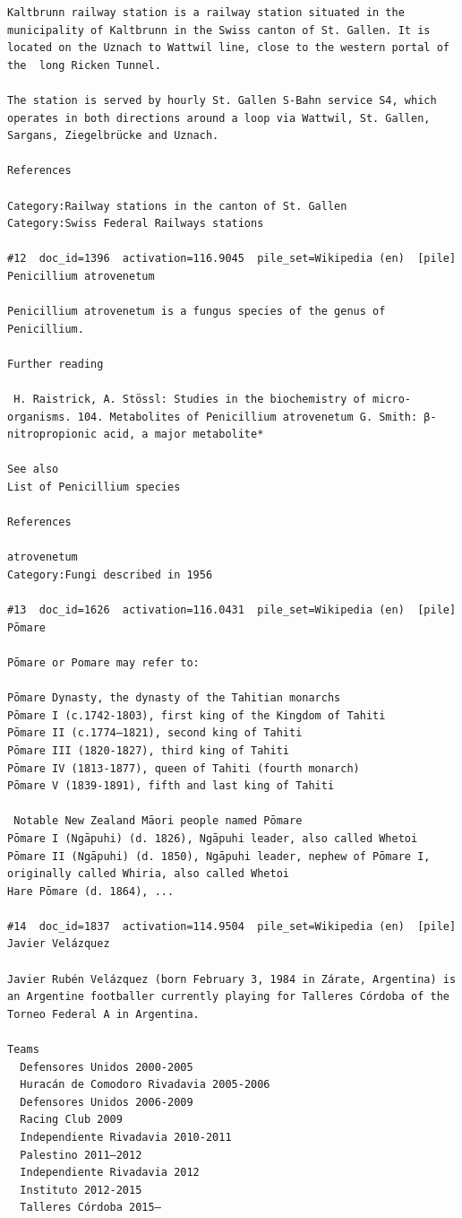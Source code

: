 \begin{verbatim}
Kaltbrunn railway station is a railway station situated in the municipality of Kaltbrunn in the Swiss canton of St. Gallen. It is located on the Uznach to Wattwil line, close to the western portal of the  long Ricken Tunnel.

The station is served by hourly St. Gallen S-Bahn service S4, which operates in both directions around a loop via Wattwil, St. Gallen, Sargans, Ziegelbrücke and Uznach.

References 

Category:Railway stations in the canton of St. Gallen
Category:Swiss Federal Railways stations

#12  doc_id=1396  activation=116.9045  pile_set=Wikipedia (en)  [pile]
Penicillium atrovenetum

Penicillium atrovenetum is a fungus species of the genus of Penicillium.

Further reading

 H. Raistrick, A. Stössl: Studies in the biochemistry of micro-organisms. 104. Metabolites of Penicillium atrovenetum G. Smith: β-nitropropionic acid, a major metabolite*

See also
List of Penicillium species

References

atrovenetum
Category:Fungi described in 1956

#13  doc_id=1626  activation=116.0431  pile_set=Wikipedia (en)  [pile]
Pōmare

Pōmare or Pomare may refer to:

Pōmare Dynasty, the dynasty of the Tahitian monarchs
Pōmare I (c.1742-1803), first king of the Kingdom of Tahiti
Pōmare II (c.1774–1821), second king of Tahiti
Pōmare III (1820-1827), third king of Tahiti
Pōmare IV (1813-1877), queen of Tahiti (fourth monarch)
Pōmare V (1839-1891), fifth and last king of Tahiti

 Notable New Zealand Māori people named Pōmare
Pōmare I (Ngāpuhi) (d. 1826), Ngāpuhi leader, also called Whetoi
Pōmare II (Ngāpuhi) (d. 1850), Ngāpuhi leader, nephew of Pōmare I, originally called Whiria, also called Whetoi
Hare Pōmare (d. 1864), ...

#14  doc_id=1837  activation=114.9504  pile_set=Wikipedia (en)  [pile]
Javier Velázquez

Javier Rubén Velázquez (born February 3, 1984 in Zárate, Argentina) is an Argentine footballer currently playing for Talleres Córdoba of the Torneo Federal A in Argentina.

Teams
  Defensores Unidos 2000-2005
  Huracán de Comodoro Rivadavia 2005-2006
  Defensores Unidos 2006-2009
  Racing Club 2009
  Independiente Rivadavia 2010-2011
  Palestino 2011–2012
  Independiente Rivadavia 2012
  Instituto 2012-2015
  Talleres Córdoba 2015–


\end{verbatim}
